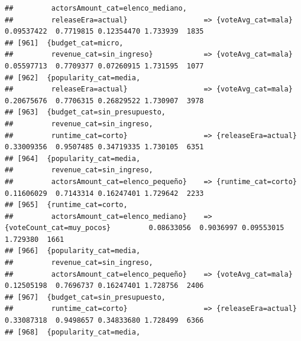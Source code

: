 \documentclass[
]{article}
\begin{document}
\begin{verbatim}
##         actorsAmount_cat=elenco_mediano,                                                                                        
##         releaseEra=actual}                  => {voteAvg_cat=mala}                0.09537422  0.7719815 0.12354470 1.733939  1835
## [961]  {budget_cat=micro,                                                                                                       
##         revenue_cat=sin_ingreso}            => {voteAvg_cat=mala}                0.05597713  0.7709377 0.07260915 1.731595  1077
## [962]  {popularity_cat=media,                                                                                                   
##         releaseEra=actual}                  => {voteAvg_cat=mala}                0.20675676  0.7706315 0.26829522 1.730907  3978
## [963]  {budget_cat=sin_presupuesto,                                                                                             
##         revenue_cat=sin_ingreso,                                                                                                
##         runtime_cat=corto}                  => {releaseEra=actual}               0.33009356  0.9507485 0.34719335 1.730105  6351
## [964]  {popularity_cat=media,                                                                                                   
##         revenue_cat=sin_ingreso,                                                                                                
##         actorsAmount_cat=elenco_pequeño}    => {runtime_cat=corto}               0.11606029  0.7143314 0.16247401 1.729642  2233
## [965]  {runtime_cat=corto,                                                                                                      
##         actorsAmount_cat=elenco_mediano}    => {voteCount_cat=muy_pocos}         0.08633056  0.9036997 0.09553015 1.729380  1661
## [966]  {popularity_cat=media,                                                                                                   
##         revenue_cat=sin_ingreso,                                                                                                
##         actorsAmount_cat=elenco_pequeño}    => {voteAvg_cat=mala}                0.12505198  0.7696737 0.16247401 1.728756  2406
## [967]  {budget_cat=sin_presupuesto,                                                                                             
##         runtime_cat=corto}                  => {releaseEra=actual}               0.33087318  0.9498657 0.34833680 1.728499  6366
## [968]  {popularity_cat=media,                                                                                                   

\end{verbatim}
\end{document}
